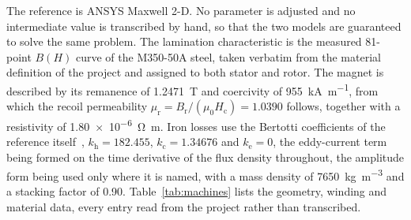\documentclass[10pt,a4paper,twocolumn]{article}
\newcommand{\murec}{\mu_{\mathrm{r}}}
\theoremstyle{plain}
\theoremstyle{remark}
\begin{document}
The reference is ANSYS Maxwell 2-D. No parameter is adjusted and no
intermediate value is transcribed by hand, so that the two models are
guaranteed to solve the same problem. The lamination characteristic is
the measured 81-point $B(H)$ curve of the M350-50A steel, taken verbatim
from the material definition of the project and assigned to both stator
and rotor. The magnet is described by its remanence of
\SI{1.2471}{\tesla} and coercivity of \SI{955}{\kilo\ampere\per\metre},
from which the recoil permeability
$\murec = B_{\mathrm{r}}/(\mu_0 H_{\mathrm{c}}) = 1.0390$ follows,
together with a resistivity of \SI{1.80e-6}{\ohm\metre}. Iron losses use
the Bertotti coefficients of the reference itself~\cite{bertotti},
$k_{\mathrm{h}} = 182.455$, $k_{\mathrm{c}} = 1.34676$ and
$k_{\mathrm{e}} = 0$, the eddy-current term being formed on the time
derivative of the flux density throughout, the amplitude form being used
only where it is named, with a mass density of
\SI{7650}{\kilogram\per\metre\cubed} and a stacking factor of 0.90.
Table~\ref{tab:machines} lists the geometry, winding and material data,
every entry read from the project rather than transcribed.
\end{document}
